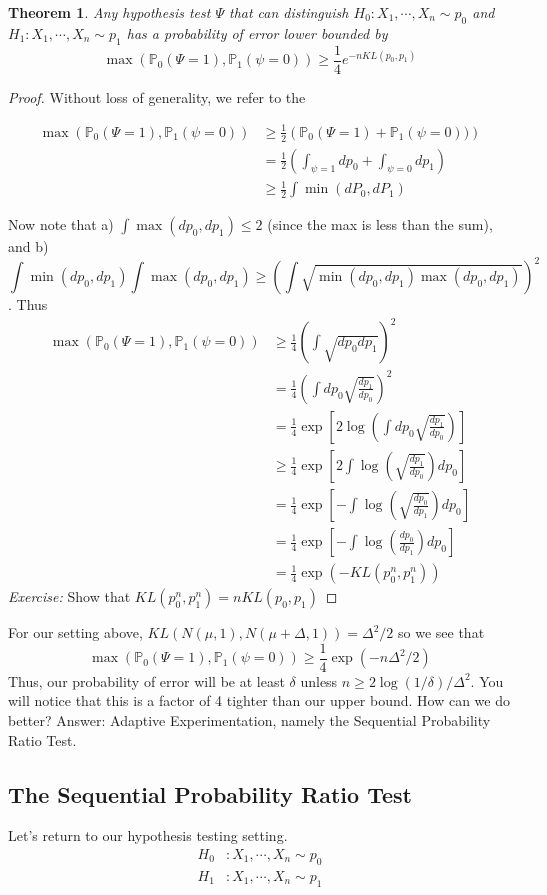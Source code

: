 \documentclass[11pt]{article}
\newtheorem{theorem}{Theorem}
\renewcommand{\P}{\mathbb{P}}
\newcommand{\1}[1]{\mathbf{1}\left\{#1\right\}}
\begin{document}
\begin{theorem}
Any hypothesis test $\Psi$ that can distinguish $H_0: X_1,\cdots, X_n \sim p_0$ and $H_1: X_1,\cdots, X_n \sim p_1$ has a probability of error lower bounded by 
\[\max(\P_0(\Psi=1), \P_1(\psi=0))\geq \frac{1}{4}e^{-nKL(p_0, p_1)}\]
\end{theorem}
\begin{proof}
Without loss of generality, we refer to the 

\begin{align*}
\max(\P_0(\Psi=1), \P_1(\psi=0))
&\geq \frac{1}{2}\left(\P_0(\Psi=1) + \P_1(\psi=0))\right)\\
&= \frac{1}{2}\left(\int_{\psi=1} dp_0  + \int_{\psi=0} dp_1\right)\\
&\geq \frac{1}{2}\int \min(dP_0, dP_1)
\end{align*}

Now note that a) $\int \max(dp_0, dp_1) \leq 2$ (since the max is less than the sum), and b) \[\int \min(dp_0, dp_1)\int \max(dp_0, dp_1)\geq (\int \sqrt{ \min(dp_0, dp_1) \max(dp_0, dp_1)})^2\]. Thus
\begin{align*}
    \max(\P_0(\Psi=1), \P_1(\psi=0)) 
    &\geq \frac{1}{4} (\int \sqrt{dp_0 dp_1})^2\\
    &= \frac{1}{4} (\int dp_0\sqrt{ \frac{dp_1}{dp_0}})^2\\
    &= \frac{1}{4} \exp[2\log\left(\int dp_0\sqrt{ \frac{dp_1}{dp_0}}\right)]\\
    &\geq \frac{1}{4} \exp[2\int\log(\sqrt{ \frac{dp_1}{dp_0}})dp_0] \tag{Jensen's inequality}\\
    &= \frac{1}{4} \exp[-\int\log(\sqrt{ \frac{dp_0}{dp_1}})dp_0]\\
    &= \frac{1}{4} \exp[-\int\log(\frac{dp_0}{dp_1})dp_0]\\
    &= \frac{1}{4} \exp(-KL(p^n_0, p^n_1))
\end{align*}
\textit{Exercise:} Show that $KL(p^n_0, p^n_1) = nKL(p_0, p_1)$
\end{proof}

For our setting above, $KL(N(\mu, 1), N(\mu+\Delta,1)) = \Delta^2/2$ so we see that 
\[\max(\P_0(\Psi=1), \P_1(\psi=0)) \geq \frac{1}{4} \exp(-n\Delta^2/2)\]
Thus, our probability of error will be at least $\delta$ unless $n \geq 2\log(1/\delta)/\Delta^2$. You will notice that this is a factor of 4 tighter than our upper bound. How can we do better? Answer: Adaptive Experimentation, namely the Sequential Probability Ratio Test. 


\subsection{The Sequential Probability Ratio Test}
Let's return to our hypothesis testing setting. 
\begin{align*}
    H_0&: X_1,\cdots, X_n \sim p_0\\
    H_1&: X_1,\cdots, X_n \sim p_1
\end{align*}
\end{document}
